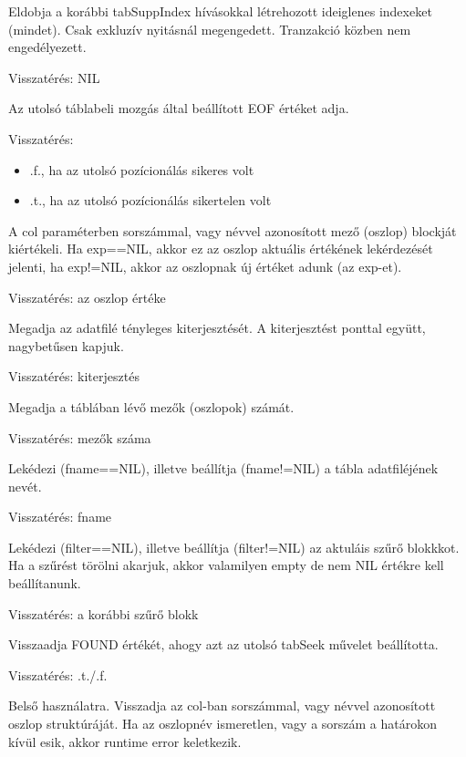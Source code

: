Eldobja a korábbi tabSuppIndex hívásokkal létrehozott ideiglenes
indexeket (mindet). Csak exkluzív nyitásnál megengedett.
Tranzakció közben nem engedélyezett.

Visszatérés: NIL


Az utolsó táblabeli mozgás által beállított EOF értéket adja.
 
Visszatérés:
\begin{itemize}
\item .f., ha az utolsó pozícionálás sikeres volt
\item .t., ha az utolsó pozícionálás sikertelen volt 
\end{itemize}
 
A col paraméterben sorszámmal, vagy névvel azonosított mező (oszlop)
blockját kiértékeli. Ha exp==NIL, akkor ez az oszlop aktuális értékének
lekérdezését jelenti, ha exp!=NIL, akkor az oszlopnak új értéket
adunk (az exp-et).

Visszatérés: az oszlop értéke



Megadja az adatfilé tényleges kiterjesztését. A kiterjesztést
ponttal együtt, nagybetűsen kapjuk.

Visszatérés: kiterjesztés


Megadja a táblában lévő mezők (oszlopok) számát.

Visszatérés: mezők száma
 

 
Lekédezi (fname==NIL), illetve beállítja (fname!=NIL) 
a tábla adatfiléjének nevét.

Visszatérés: fname
 

Lekédezi (filter==NIL), illetve beállítja (filter!=NIL) 
az aktuláis szűrő blokkkot. Ha a szűrést törölni akarjuk, 
akkor valamilyen empty de nem NIL értékre kell beállítanunk.

Visszatérés: a korábbi szűrő blokk


Visszaadja FOUND értékét, ahogy azt az utolsó tabSeek
művelet beállította.

Visszatérés: .t./.f.


Belső használatra. Visszadja az col-ban sorszámmal, vagy
névvel azonosított oszlop struktúráját. Ha az oszlopnév ismeretlen,
vagy a sorszám a  határokon kívül esik, akkor runtime error keletkezik.

